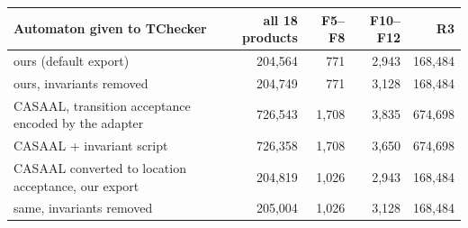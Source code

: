 \begin{tabular}{@{}lrrrr@{}}
\toprule
Automaton given to TChecker & all 18 products & F5--F8 & F10--F12 & R3 \\
\midrule
ours (default export) & 204{,}564 & 771 & 2{,}943 & 168{,}484 \\
ours, invariants removed & 204{,}749 & 771 & 3{,}128 & 168{,}484 \\
CASAAL, transition acceptance encoded by the adapter & 726{,}543 & 1{,}708 & 3{,}835 & 674{,}698 \\
CASAAL + invariant script & 726{,}358 & 1{,}708 & 3{,}650 & 674{,}698 \\
CASAAL converted to location acceptance, our export & 204{,}819 & 1{,}026 & 2{,}943 & 168{,}484 \\
same, invariants removed & 205{,}004 & 1{,}026 & 3{,}128 & 168{,}484 \\
\bottomrule
\end{tabular}
